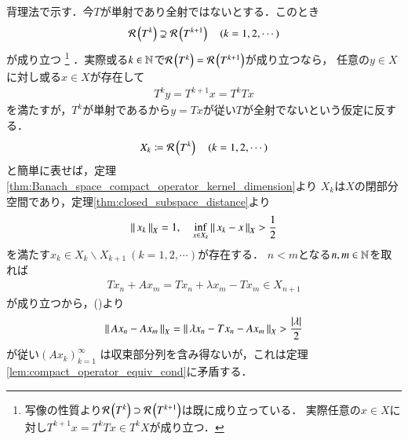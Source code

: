 	\begin{prf}
		背理法で示す．今$T$が単射であり全射ではないとする．このとき
		\begin{align}
			\mathcal{R}\left( T^k \right) \supsetneq \mathcal{R}\left( T^{k+1} \right) \quad (k = 1,2,\cdots)
		\end{align}
		が成り立つ
		\footnote{
			写像の性質より$\mathcal{R}\left( T^k \right) \supset \mathcal{R}\left( T^{k+1} \right)$は既に成り立っている．
			実際任意の$x \in X$に対し$T^{k+1}x = T^k Tx \in T^k X$が成り立つ．
		}
		．実際或る$k \in \mathbb{N}$で$\mathcal{R}\left( T^k \right) = \mathcal{R}\left( T^{k+1} \right)$が成り立つなら，
		任意の$y \in X$に対し或る$x \in X$が存在して
		\begin{align}
			T^{k} y = T^{k+1} x = T^k T x
		\end{align}
		を満たすが，$T^k$が単射であるから$y = T x$が従い$T$が全射でないという仮定に反する．
		\begin{align}
			X_k \coloneqq \mathcal{R}\left( T^k \right) \quad (k = 1,2,\cdots)
		\end{align}
		と簡単に表せば，定理\ref{thm:Banach_space_compact_operator_kernel_dimension}より
		$X_k$は$X$の閉部分空間であり，定理\ref{thm:closed_subspace_distance}より
		\begin{align}
			\left\|\, x_k\, \right\|_{X} = 1,
			\quad \operatorname*{inf}_{x \in X_k} \left\|\, x_k - x\, \right\|_{X} > \frac{1}{2}
			\label{eq:lem_T_injective_then_surjective}
		\end{align}
		を満たす$x_k \in X_k \backslash X_{k+1}\ (k=1,2,\cdots)$が存在する．
		$n < m$となる$n,m \in \mathbb{N}$を取れば
		\begin{align}
			T x_n + A x_m = T x_n + \lambda x_m - T x_m \in X_{n+1}
		\end{align}
		が成り立つから，()より
		\begin{align}
			\left\|\, A x_n - A x_m\, \right\|_{X} = \left\|\, \lambda x_n - T x_n - A x_m\, \right\|_{X} > \frac{|\lambda|}{2}
		\end{align}
		が従い$\left( A x_k \right)_{k=1}^{\infty}$
		は収束部分列を含み得ないが，これは定理\ref{lem:compact_operator_equiv_cond}に矛盾する．
		\QED
	\end{prf}
